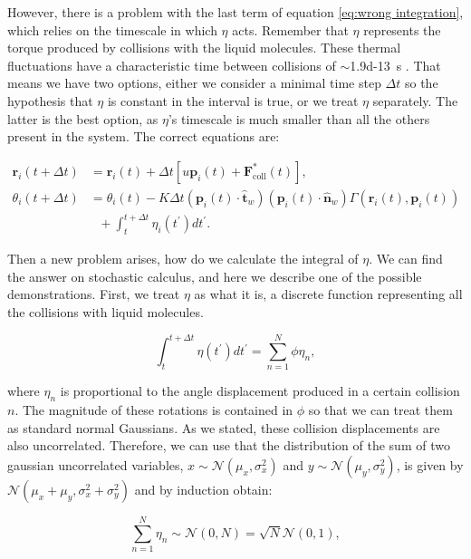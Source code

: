 However, there is a problem with the last term of equation \eqref{eq:wrong integration}, which relies on the timescale in which $\eta$ acts. Remember that $\eta$ represents the torque produced by collisions with the liquid molecules. These thermal fluctuations have a characteristic time between collisions of $\sim$\SI{1.9d-13}{\second} \cite{Soto2016KineticPhenomena}. That means we have two options, either we consider a minimal time step $\Delta t$ so the hypothesis that $\eta$ is constant in the interval is true, or we treat $\eta$ separately. The latter is the best option, as $\eta$'s timescale is much smaller than all the others present in the system. The correct equations are:

\begin{align}
    \textbf{r}_i(t+\Delta t) &=  \textbf{r}_i(t) + \Delta t[u \textbf{p}_i(t) + \textbf{F}^*_{\text{coll}}(t)], \\
    \theta_i(t+\Delta t) &=  \theta_i(t) - K \Delta t  (\textbf{p}_i(t) \cdot \hat{\textbf{t}}_w)  (\textbf{p}_i(t) \cdot \hat{\textbf{n}}_w) \Gamma(\textbf{r}_i(t), \textbf{p}_i(t)) \nonumber \\
     &\ \ \ + \int_t^{t+\Delta t}\eta_i(t^\prime)dt^\prime .
\end{align}


Then a new problem arises, how do we calculate the integral of $\eta$. We can find the answer on stochastic calculus, and here we describe one of the possible demonstrations. First, we treat $\eta$ as what it is, a discrete function representing all the collisions with liquid molecules.

\begin{equation}
    \int_t^{t+\Delta t}\eta(t^\prime)dt^\prime = \sum_{n=1}^N \phi\eta_n,
\end{equation}

where $\eta_n$ is proportional to the angle displacement produced in a certain collision $n$. The magnitude of these rotations is contained in $\phi$ so that we can treat them as standard normal Gaussians. As we stated, these collision displacements are also uncorrelated. Therefore, we can use that the distribution of the sum of two gaussian uncorrelated variables, $x\sim\mathcal{N}(\mu_x,\sigma_x^2)$ and $y\sim\mathcal{N}(\mu_y,\sigma_y^2)$, is given by $\mathcal{N}(\mu_x+\mu_y,\sigma_x^2+\sigma_y^2)$ and by induction obtain:

\begin{equation}
    \sum_{n=1}^N \eta_n \sim \mathcal{N}(0,N) = \sqrt{N}\mathcal{N}(0,1),
\end{equation}

